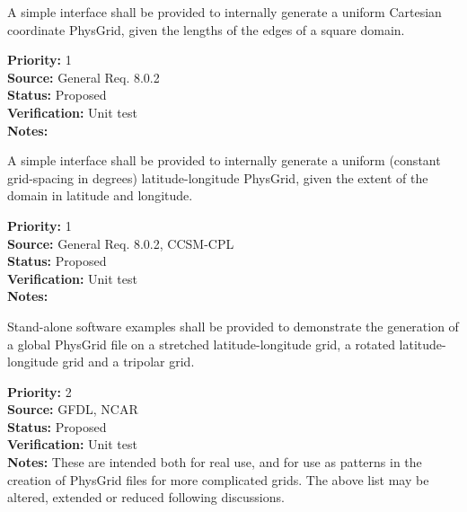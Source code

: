 A simple interface shall be provided to internally generate a uniform Cartesian
coordinate PhysGrid, given the lengths of the edges of a square domain.
\begin{reqlist}
{\bf Priority:} 1 \\
{\bf Source:} General Req. 8.0.2 \\
{\bf Status:} Proposed \\
{\bf Verification:} Unit test\\
{\bf Notes:} 
\end{reqlist}

A simple interface shall be provided to internally generate a uniform (constant
grid-spacing in degrees) latitude-longitude PhysGrid, given the extent of the domain
in latitude and longitude.                                                           
\begin{reqlist}
{\bf Priority:} 1 \\
{\bf Source:} General Req. 8.0.2, CCSM-CPL \\
{\bf Status:} Proposed \\
{\bf Verification:} Unit test\\
{\bf Notes:} 
\end{reqlist}

Stand-alone software examples shall be provided to demonstrate the generation of a
global PhysGrid file on a stretched latitude-longitude grid, a rotated
latitude-longitude grid and a tripolar grid. 
\begin{reqlist}
{\bf Priority:} 2 \\
{\bf Source:} GFDL, NCAR \\
{\bf Status:} Proposed \\
{\bf Verification:} Unit test\\
{\bf Notes:} These are intended both for real use, and for use as patterns in the
creation of PhysGrid files for more complicated grids.  The above list may be
altered, extended or reduced following discussions.
\end{reqlist}

